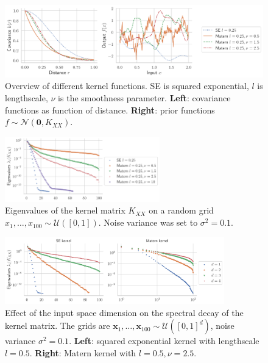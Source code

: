 \documentclass{article}
\newcommand{\vect}[1]{\boldsymbol{\mathbf{#1}}}
\begin{document}
\begin{figure}
    \centering
    \includegraphics[width=\textwidth]{res/covariance_overview.pdf}
    \caption{Overview of different kernel functions. SE is squared exponential, $l$ is lengthscale, $\nu$ is the smoothness parameter. \textbf{Left}: covariance functions as function of distance. \textbf{Right}: prior functions $f \sim \mathcal N(\vect 0, K_{XX})$.}
    \label{fig:kernel_overview}
\end{figure}

\begin{figure}
    \centering
    \includegraphics[width=0.6\textwidth]{res/kernel_eigenvalues.pdf}
    \caption{Eigenvalues of the kernel matrix $K_{XX}$ on a random grid $x_1, \ldots, x_{100} \sim \mathcal U([0, 1])$. Noise variance was set to $\sigma^2 = 0.1$.
    }
    \label{fig:kernel_mx_eigvals}
\end{figure}

\begin{figure}
    \centering
    \includegraphics[width=0.85\textwidth]{res/kernel_eigenvalues_dimension.pdf}
    \caption{Effect of the input space dimension on the spectral decay of the kernel matrix. The grids are $\vect x_1, \ldots, \vect x_{100} \sim \mathcal U([0, 1]^d)$, noise variance $\sigma^2 = 0.1$. \textbf{Left}: squared exponential kernel with lengthscale $l=0.5$. \textbf{Right}: Matern kernel with $l=0.5, \nu = 2.5$.}
    \label{fig:my_label}
\end{figure}
\end{document}
